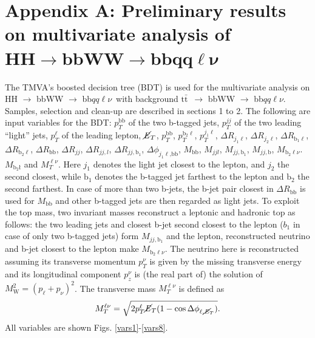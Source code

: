 \documentclass[10pt,a4paper]{article}
\renewcommand{\tt}{\ensuremath{\text{t}\bar{\text{t}}}}
\newcommand{\semi}{$\rightarrow$ bbWW $\rightarrow$ bb$qq\ell\nu$}
\newcommand{\lnu}{$\ell\nu$}
\newcommand{\bb}{\text{bb}}
\newcommand{\MET}{$\cancel{\it{E}}_{T}$}
\begin{document}
\section*{Appendix A: Preliminary results on multivariate analysis of\\ \mbox{$\bm{\text{HH} \rightarrow \text{bbWW} \rightarrow \text{bb} qq\ell\nu}$}}

The TMVA's boosted decision tree (BDT) is used for the multivariate analysis on HH \semi\ with background \tt\ \semi. Samples, selection and clean-up are described in sections 1 to 2. The following are input variables for the BDT:
$p_T^\text{bb}$ of the two b-tagged jets,
$p_T^{jj}$ of the two leading ``light'' jets,
$p_T^\ell$ of the leading lepton,
\MET,
$p_T^\text{bb}$,
$p_T^{\text{b}_2\ell}$,
$p_T^{j_1\ell}$,
$\Delta R_{j_1\ell}$,
$\Delta R_{j_2\ell}$,
$\Delta R_{\text{b}_1\ell}$,
$\Delta R_{\text{b}_2\ell}$,
$\Delta R_{\bb}$,
$\Delta R_{jj}$,
$\Delta R_{jj,l}$,
$\Delta R_{jj,\text{b}_1}$,
$\Delta\phi_{j_1\ell\text{,bb}}$,
$M_{\bb}$,
$M_{jjl}$,
$M_{jj,\text{b}_1}$,
$M_{jj,\text{b}}$,
$M_{\text{b}_2\text{\lnu}}$.
$M_{\text{b}_2\text{\l}}$ and
$M_T^{\ell\nu}$.
Here $j_1$ denotes the light jet closest to the lepton, and $j_2$ the second closest, while $\text{b}_1$ denotes the b-tagged jet farthest to the lepton and $\text{b}_2$ the second farthest. In case of more than two b-jets, the b-jet pair closest in $\Delta R_{\bb}$ is used for $M_{\bb}$ and other b-tagged jets are then regarded as light jets.
To exploit the top mass, two invariant masses reconstruct a leptonic and hadronic top as follows: the two leading jets and closest b-jet second closest to the lepton ($b_1$ in case of only two b-tagged jets) form $M_{jj,\text{b}_1}$ and the lepton, reconstructed neutrino and b-jet closest to the lepton make $M_{\text{b}_2\text{\lnu}}$. The neutrino here is reconstructed assuming its transverse momentum $p^\nu_T$ is given by the missing transverse energy and its longitudinal component $p^\nu_z$ is (the real part of) the solution of $M_\text{W}^2 = (p_\ell + p_\nu)^2$.
The transverse mass $M_T^{\ell\nu}$ is defined as
\begin{equation} \label{MT}
	M_T^{\ell\nu} = \sqrt{ 2 p_T^\ell \text{\MET} ( 1 - \cos \Delta \phi_{\ell,\text{\MET}} )}.
\end{equation}
All variables are shown Figs. \ref{vars1}-\ref{vars8}.
\end{document}
